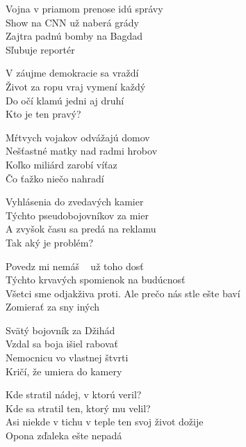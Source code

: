 
\re{}
Vojna v priamom prenose idú správy\\
Show na CNN už naberá grády\\
Zajtra padnú bomby na Bagdad\\
Sľubuje reportér

\re{}
V záujme demokracie sa vraždí\\
Život za ropu vraj vymení každý\\
Do očí klamú jedni aj druhí\\
Kto je ten pravý? 

Mŕtvych vojakov odvážajú domov\\
Nešťastné matky nad radmi hrobov\\
Koľko miliárd zarobí víťaz\\
Čo ťažko niečo nahradí

Vyhlásenia do zvedavých kamier\\
Týchto pseudobojovníkov za mier\\
A zvyšok času sa predá na reklamu \\
Tak aký je problém? 

\cho{}
Povedz mi nemáš \  už toho dosť\\ 
Týchto krvavých spomienok na budúcnosť\\ 
Všetci sme odjakživa proti. Ale prečo nás stle ešte baví\\
Zomierať za sny iných 

Svätý bojovník za Džihád\\
Vzdal sa boja išiel rabovať\\
Nemocnicu vo vlastnej štvrti\\
Kričí, že umiera do kamery 

Kde stratil nádej, v ktorú veril?\\
Kde sa stratil ten, ktorý mu velil?\\
Asi niekde v tichu v teple ten svoj život dožije\\
Opona zďaleka ešte nepadá 

\esong{}